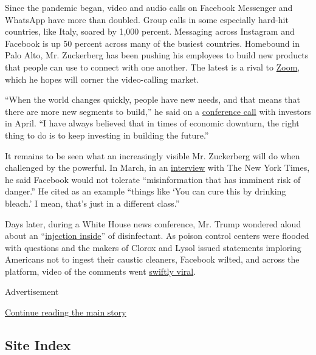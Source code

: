Since the pandemic began, video and audio calls on Facebook Messenger
and WhatsApp have more than doubled. Group calls in some especially
hard-hit countries, like Italy, soared by 1,000 percent. Messaging
across Instagram and Facebook is up 50 percent across many of the
busiest countries. Homebound in Palo Alto, Mr. Zuckerberg has been
pushing his employees to build new products that people can use to
connect with one another. The latest is a rival to
\href{https://www.nytimes3xbfgragh.onion/2020/04/24/technology/zoom-rivals-virus-facebook-google.html}{Zoom},
which he hopes will corner the video-calling market.

``When the world changes quickly, people have new needs, and that means
that there are more new segments to build,'' he said on a
\href{https://www.fool.com/earnings/call-transcripts/2020/04/29/facebook-inc-fb-q1-2020-earnings-call-transcript.aspx}{conference
call} with investors in April. ``I have always believed that in times of
economic downturn, the right thing to do is to keep investing in
building the future.''

It remains to be seen what an increasingly visible Mr. Zuckerberg will
do when challenged by the powerful. In March, in an
\href{https://www.nytimes3xbfgragh.onion/2020/03/15/business/media/coronavirus-facebook-twitter-social-media.html}{interview}
with The New York Times, he said Facebook would not tolerate
``misinformation that has imminent risk of danger.'' He cited as an
example ``things like `You can cure this by drinking bleach.' I mean,
that's just in a different class.''

Days later, during a White House news conference, Mr. Trump wondered
aloud about an
``\href{https://www.nytimes3xbfgragh.onion/2020/04/24/us/politics/trump-inject-disinfectant-bleach-coronavirus.html}{injection
inside}'' of disinfectant. As poison control centers were flooded with
questions and the makers of Clorox and Lysol issued statements imploring
Americans not to ingest their caustic cleaners, Facebook wilted, and
across the platform, video of the comments went
\href{https://www.nytimes3xbfgragh.onion/2020/04/30/technology/trump-coronavirus-social-media.html}{swiftly
viral}.

Advertisement

\protect\hyperlink{after-bottom}{Continue reading the main story}

\hypertarget{site-index}{%
\subsection{Site Index}\label{site-index}}

